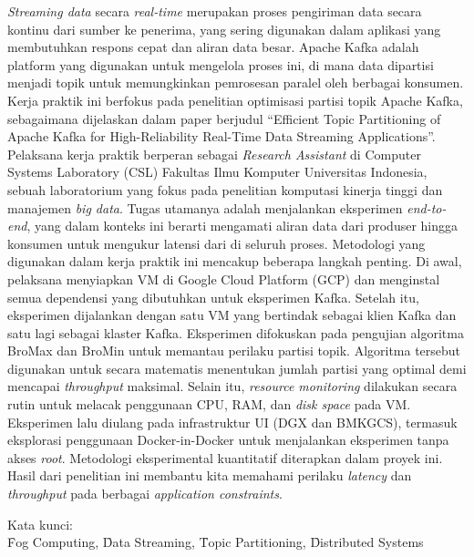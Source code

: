 \noindent \textit{Streaming data} secara \textit{real-time} merupakan proses pengiriman data secara kontinu dari sumber ke penerima, yang sering digunakan dalam aplikasi yang membutuhkan respons cepat dan aliran data besar. Apache Kafka adalah platform yang digunakan untuk mengelola proses ini, di mana data dipartisi menjadi topik untuk memungkinkan pemrosesan paralel oleh berbagai konsumen. Kerja praktik ini berfokus pada penelitian optimisasi partisi topik Apache Kafka, sebagaimana dijelaskan dalam paper berjudul ``Efficient Topic Partitioning of Apache Kafka for High-Reliability Real-Time Data Streaming Applications''. Pelaksana kerja praktik berperan sebagai \textit{Research Assistant} di Computer Systems Laboratory (CSL) Fakultas Ilmu Komputer Universitas Indonesia, sebuah laboratorium yang fokus pada penelitian komputasi kinerja tinggi dan manajemen \textit{big data}. Tugas utamanya adalah menjalankan eksperimen \textit{end-to-end}, yang dalam konteks ini berarti mengamati aliran data dari produser hingga konsumen untuk mengukur latensi dari di seluruh proses. Metodologi yang digunakan dalam kerja praktik ini mencakup beberapa langkah penting. Di awal, pelaksana menyiapkan VM di Google Cloud Platform (GCP) dan menginstal semua dependensi yang dibutuhkan untuk eksperimen Kafka. Setelah itu, eksperimen dijalankan dengan satu VM yang bertindak sebagai klien Kafka dan satu lagi sebagai klaster Kafka. Eksperimen difokuskan pada pengujian algoritma BroMax dan BroMin untuk memantau perilaku partisi topik. Algoritma tersebut digunakan untuk secara matematis menentukan jumlah partisi yang optimal demi mencapai \textit{throughput} maksimal. Selain itu, \textit{resource monitoring} dilakukan secara rutin untuk melacak penggunaan CPU, RAM, dan \textit{disk space} pada VM. Eksperimen lalu diulang pada infrastruktur UI (DGX dan BMKGCS), termasuk eksplorasi penggunaan Docker-in-Docker untuk menjalankan eksperimen tanpa akses \textit{root}. Metodologi eksperimental kuantitatif diterapkan dalam proyek ini. Hasil dari penelitian ini membantu kita memahami perilaku \textit{latency} dan \textit{throughput} pada berbagai \textit{application constraints}. \\

\vspace*{0.2cm}

\noindent Kata kunci: \\ \f{Fog Computing}, \f{Data Streaming}, \f{Topic Partitioning}, \f{Distributed Systems} \\

\newpage
